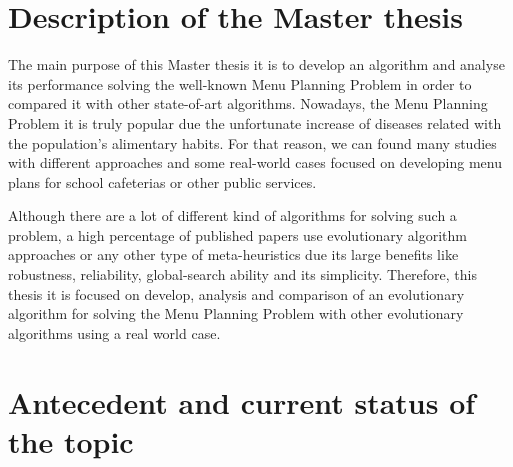 \section{Description of the Master thesis}

The main purpose of this Master thesis it is to develop an algorithm and analyse its performance solving the well-known Menu Planning Problem in order to compared it with other state-of-art algorithms. Nowadays, the Menu Planning Problem it is truly popular due the unfortunate increase of diseases related with the population's alimentary habits. For that reason, we can found many studies with different approaches and some real-world cases focused on developing menu plans for school cafeterias or other public services.

Although there are a lot of different kind of algorithms for solving such a problem, a high percentage of published papers use evolutionary algorithm approaches or any other type of meta-heuristics due its large benefits like robustness, reliability, global-search ability and its simplicity. Therefore, this thesis it is focused on develop, analysis and comparison of an evolutionary algorithm for solving the Menu Planning Problem with other evolutionary algorithms 
using a real world case.

\section{Antecedent and current status of the topic}